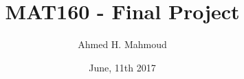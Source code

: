 \documentclass[12pt]{article}
\begin{document}
\title{MAT160 - Final Project}
\author{Ahmed H. Mahmoud}
\date{June, 11th 2017} 

\maketitle

\newcommand{\cn}{Crank-Nicolson}







\newpage



\newpage






\end{document}
